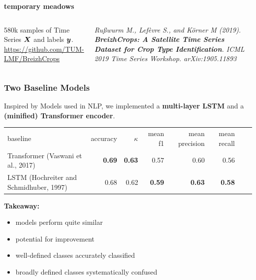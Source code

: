 \begin{frame}
\begin{columns}
	
	\textbf{temporary meadows}
	
\end{columns}



\begin{columns}
	
	580k samples of Time Series $\M{X}$ and labels $\V{y}$. \Large \url{https://github.com/TUM-LMF/BreizhCrops}
	
	
	\small\raggedright
	\textsl{
		Rußwurm M., Lefèvre S., and Körner M (2019). \textbf{BreizhCrops: A Satellite Time Series Dataset for Crop Type Identification}. ICML 2019 Time Series Workshop. arXiv:1905.11893
	}
	
\end{columns}

\end{frame}


\begin{frame}
\frametitle{Two Baseline Models}

\Large
Inspired by Models used in NLP, we implemented a \textbf{multi-layer LSTM} and a \textbf{(minified) Transformer encoder}.

\vspace{1em}
\normalsize

\begin{tabular}{lrrrrrrr}
\toprule
baseline & accuracy & $\kappa$ & mean f1 & mean precision  & mean recall \\
\cmidrule(lr){1-1}\cmidrule(lr){2-2}\cmidrule(lr){3-3}\cmidrule(lr){4-4}\cmidrule(lr){5-5}\cmidrule(lr){6-6}\cmidrule(lr){7-7}
Transformer {\small (Vaswani et al., 2017)} & \textbf{0.69}  &  \textbf{0.63} & 0.57 & {0.60} & 0.56 \\
LSTM {\small (Hochreiter and Schmidhuber, 1997)} & 0.68 & 0.62 & \textbf{0.59} & \textbf{0.63} & \textbf{0.58} \\
\bottomrule
\end{tabular}

\vspace{1em}

\Large
\textbf{Takeaway:} 
\begin{itemize}
\item models perform quite similar
\item potential for improvement
\item well-defined classes accurately classified
\item broadly defined classes systematically confused
\end{itemize}

\end{frame}

